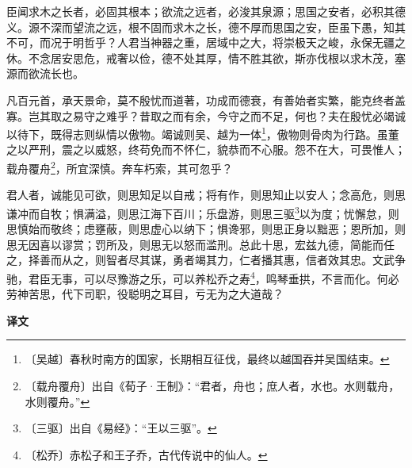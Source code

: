 \documentclass[12pt,UTF-8,openany,a4]{ctexbook}
\begin{document}
\begin{large}
    
    臣闻求木之长者，必固其根本；欲流之远者，必浚其泉源；思国之安者，必积其德义。源不深而望流之远，根不固而求木之长，德不厚而思国之安，臣虽下愚，知其不可，而况于明哲乎？人君当神器之重，居域中之大，将崇极天之峻，永保无疆之休。不念居安思危，戒奢以俭，德不处其厚，情不胜其欲，斯亦伐根以求木茂，塞源而欲流长也。
    
    凡百元首，承天景命，莫不殷忧而道著，功成而德衰，有善始者实繁，能克终者盖寡。岂其取之易守之难乎？昔取之而有余，今守之而不足，何也？夫在殷忧必竭诚以待下，既得志则纵情以傲物。竭诚则吴、越为一体\footnote{〔吴越〕\yiwen 春秋时南方的国家，长期相互征伐，最终以越国吞并吴国结束。}，傲物则骨肉为行路。虽董之以严刑，震之以威怒，终苟免而不怀仁，貌恭而不心服。怨不在大，可畏惟人；载舟覆舟\footnote{〔载舟覆舟〕\yiwen 出自《荀子·王制》：“君者，舟也；庶人者，水也。水则载舟，水则覆舟。”}，所宜深慎。奔车朽索，其可忽乎？
    
    君人者，诚能见可欲，则思知足以自戒；将有作，则思知止以安人；念高危，则思谦冲而自牧；惧满溢，则思江海下百川；乐盘游，则思三驱\footnote{〔三驱〕\yiwen 出自《易经》：“王以三驱”。}以为度；忧懈怠，则思慎始而敬终；虑壅蔽，则思虚心以纳下；惧谗邪，则思正身以黜恶；恩所加，则思无因喜以谬赏；罚所及，则思无以怒而滥刑。总此十思，宏兹九德，简能而任之，择善而从之，则智者尽其谋，勇者竭其力，仁者播其惠，信者效其忠。文武争驰，君臣无事，可以尽豫游之乐，可以养松乔之寿\footnote{〔松乔〕\yiwen 赤松子和王子乔，古代传说中的仙人。}，鸣琴垂拱，不言而化。何必劳神苦思，代下司职，役聪明之耳目，亏无为之大道哉？
\end{large}


\newpage

\begin{Large}
    \noindent\textbf{译文}
\end{Large}


\vspace{1em}
\end{document}
